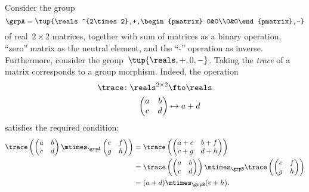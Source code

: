 \begin{example}
  Consider the group
  \begin{equation}
    \grpA=\tup{\reals^{2\times 2},+,\begin{pmatrix} 0&0\\0&0\end{pmatrix},-}
  \end{equation} of real~$2\times 2$ matrices, together with sum of matrices as a binary operation, ``zero'' matrix as the neutral element, and the ``-'' operation as inverse.
  Furthermore, consider the group~$\tup{\reals,+,0,-}$. Taking the \emph{trace} of a matrix corresponds to a group morphism. Indeed, the operation
  \begin{equation*}
    \begin{aligned}
   \trace\colon \reals^{2\times 2}&\fto \reals\\
    \begin{pmatrix}
      a&b\\
      c&d
  \end{pmatrix}&\mapsto a+d
  \end{aligned}
  \end{equation*}
  satisfies the required condition:
  \begin{equation*}
    \begin{aligned}
      \trace \left(\begin{pmatrix}
      a&b\\
      c&d
  \end{pmatrix} \mtimes_\grpA \begin{pmatrix}
      e&f\\
      g&h
  \end{pmatrix} \right)&=\trace \left( \begin{pmatrix}
      a+e&b+f\\
      c+g&d+h
  \end{pmatrix}\right)\\
      &=\trace \left( \begin{pmatrix}
      a&b\\
      c&d
  \end{pmatrix}\right)\mtimes_\grpB \trace \left( \begin{pmatrix}
      e&f\\
      g&h
  \end{pmatrix}\right)\\
      &=(a+d)\mtimes_\grpB (e+h).
    \end{aligned}
  \end{equation*}
\end{example}
